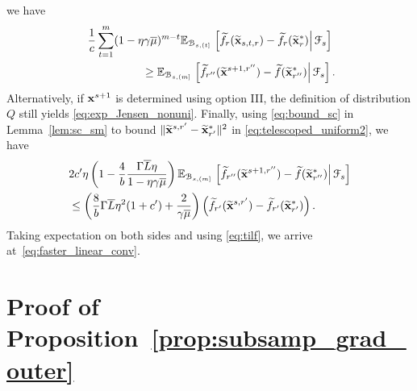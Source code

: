 \documentclass[10pt,twocolumn,journal]{IEEEtran}
\begin{document}
 we have
\begin{align}
&\frac{1}{c}\sum_{t=1}^m(1-\eta\gamma\overline{\mu})^{m-t}\mathbb{E}_{\mathcal{B}_{s,(t]}}\left.\left[\widetilde{f}_r(\widetilde{\mathbf{x}}_{s,t,r})-\widetilde{f}_r(\widetilde{\mathbf{x}}^*_{r})\right\vert\mathcal{F}_{s}\right]\nonumber\\\
&\hspace{1.7cm}\ge \mathbb{E}_{\mathcal{B}_{s,(m]}}\left.\left[ \widetilde{f}_{r''}(\widetilde{\mathbf{x}}^{s+1,r''})-\widetilde{f}(\widetilde{\mathbf{x}}^*_{r''})\right\vert\mathcal{F}_s\right]. \label{eq:exp_Jensen_nonuni}
\end{align}
Alternatively, if $\mathbf{x}^{s+1}$ is determined using option III, the definition of distribution $Q$ still yields \eqref{eq:exp_Jensen_nonuni}. 
Finally, using \eqref{eq:bound_sc} in Lemma~\ref{lem:sc_sm} to bound $\Vert\widetilde{\mathbf{x}}^{s,r'}-\widetilde{\mathbf{x}}_{r'}^*\Vert^2$ in \eqref{eq:telescoped_uniform2}, we have
\begin{align}
&2c'\eta\left(1-\frac{4}{b}\frac{\Gamma\overline{L}\eta}{1-\eta\gamma\overline{\mu}}\right)\mathbb{E}_{\mathcal{B}_{s,(m]}}\left.\left[ \widetilde{f}_{r''}(\widetilde{\mathbf{x}}^{s+1,r''})-\widetilde{f}(\widetilde{\mathbf{x}}^*_{r''})\right\vert\mathcal{F}_s\right]\nonumber\\
&\hspace{0cm}\le\left(\frac{8}{b}\Gamma\overline{L}\eta^2(1+c')+\frac{2}{\gamma\overline{\mu}}\right)\left(\widetilde{f}_{r'}(\widetilde{\mathbf{x}}^{s,r'})-\widetilde{f}_{r'}(\widetilde{\mathbf{x}}_{r'}^*)\right).
\end{align}
Taking expectation on both sides and using \eqref{eq:tilf}, we arrive at~\eqref{eq:faster_linear_conv}.

\section{Proof of Proposition~\ref{prop:subsamp_grad_outer} }\label{sec:proof_subsamp_grad_outer}
\end{document}
